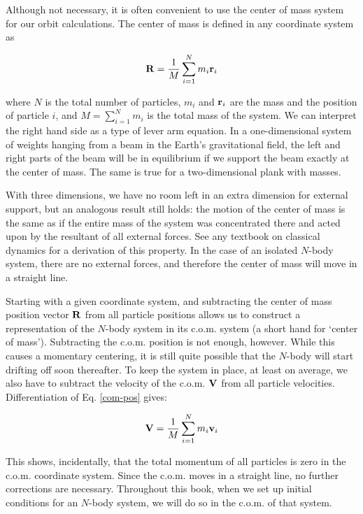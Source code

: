 Although not necessary, it is often convenient to use the center of
mass system for our orbit calculations.  The center of mass is defined
in any coordinate system as

\begin{equation}
\bR = \frac{1}{M} \sum_{i=1}^N m_i\br_i \label{com-pos}
\end{equation}

\noindent
where $N$ is the total number of particles, $m_i$ and ${\bf r}_i$ are the
mass and the position of particle $i$, and $M=\sum_{i=1}^N m_i$ is the
total mass of the system.  We can interpret the right hand side as a
type of lever arm equation.  In a one-dimensional system of weights
hanging from a beam in the Earth's gravitational field, the left and
right parts of the beam will be in equilibrium if we support the beam
exactly at the center of mass.  The same is true for a two-dimensional
plank with masses.

With three dimensions, we have no room left in an extra dimension for
external support, but an analogous result still holds: the motion of
the center of mass is the same as if the entire mass of the system was
concentrated there and acted upon by the resultant of all external
forces.  See any textbook on classical dynamics for a derivation of
this property.  In the case of an isolated $N$-body system, there are
no external forces, and therefore the center of mass will move in a
straight line.

Starting with a given coordinate system, and subtracting the center of
mass position vector ${\bf R}$ from all particle positions allows us to
construct a representation of the $N$-body system in its c.o.m. system
(a short hand for `center of mass').  Subtracting the c.o.m. position
is not enough, however.  While this causes a momentary centering, it
is still quite possible that the $N$-body will start drifting off soon
thereafter.  To keep the system in place, at least on average, we also
have to subtract the velocity of the c.o.m. ${\bf V}$ from all particle
velocities.  Differentiation of Eq. \ref{com-pos} gives:

\begin{equation}
\bV = \frac{1}{M} \sum_{i=1}^N m_i\bv_i \label{com-vel}
\end{equation}

\noindent
This shows, incidentally, that the total momentum of all particles is
zero in the c.o.m. coordinate system.  Since the c.o.m. moves in a
straight line, no further corrections are necessary.  Throughout this
book, when we set up initial conditions for an $N$-body system, we
will do so in the c.o.m. of that system.

